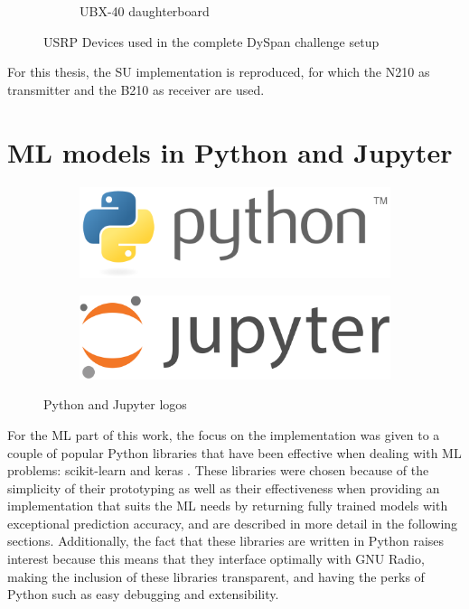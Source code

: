 \begin{figure}[htb]
\begin{subfigure}[htb]{0.4\textwidth}
        \caption{UBX-40 daughterboard\cite{UBX}}
        \label{fig:UBX}
    \end{subfigure}
    \caption{\ac{USRP} Devices used in the complete DySpan challenge setup}
    \label{fig:ettus}
\end{figure}

For this thesis, the \ac{SU} implementation is reproduced, for which the N210 as transmitter and the B210 as receiver are used.

\section{\ac{ML} models in Python and Jupyter}
\begin{figure}[!h]
    \centering
    \begin{subfigure}[htb]{0.45\textwidth}
        \centering
        \includegraphics[width=\linewidth]{figures/python_logo}
        \label{fig:python}
    \end{subfigure}
    \begin{subfigure}[htb]{0.45\textwidth}
        \centering
        \includegraphics[width=\linewidth]{figures/jupyter_logo}
        \label{fig:jupyter}
    \end{subfigure}
    \caption{Python and Jupyter logos}
    \label{fig:python_jupyter}
\end{figure}
For the \ac{ML} part of this work, the focus on the implementation was given to a couple of popular Python libraries that have been effective when dealing with \ac{ML} problems: scikit-learn \cite{SKLEARN} and keras \cite{KERAS}. These libraries were chosen because of the simplicity of their prototyping as well as their effectiveness when providing an implementation that suits the \ac{ML} needs by returning fully trained models with exceptional prediction accuracy, and are described in more detail in the following sections. Additionally, the fact that these libraries are written in Python raises interest because this means that they interface optimally with GNU Radio, making the inclusion of these libraries transparent, and having the perks of Python such as easy debugging and extensibility.\\

